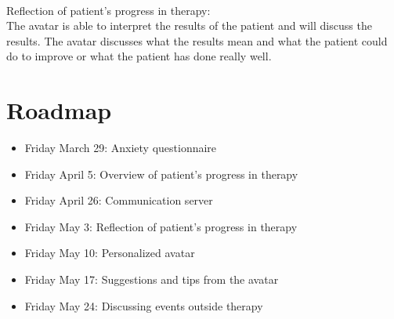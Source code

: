 \paragraph{}
Reflection of patient's progress in therapy: \\
The \gls{avatar} is able to interpret the results of the patient and will discuss the results. The \gls{avatar} discusses what the results mean and what the patient could do to improve or what the patient has done really well.

\section{Roadmap}
\begin{itemize}
\item Friday March 29: Anxiety questionnaire	
\item Friday April 5: Overview of patient's progress in therapy
\item Friday April 26: Communication server
\item Friday May 3: Reflection of patient's progress in therapy
\item Friday May 10: Personalized \gls{avatar}
\item Friday May 17: Suggestions and tips from the \gls{avatar}	
\item Friday May 24: Discussing events outside therapy
\end{itemize}
